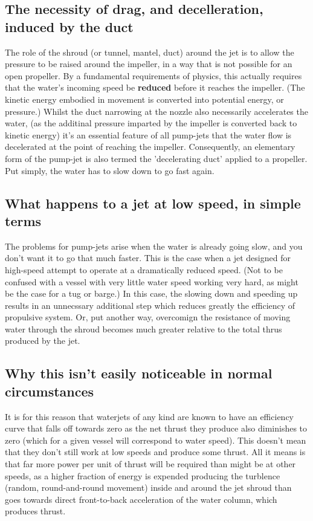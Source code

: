 \documentclass{article}\usepackage[]{graphicx}\usepackage[]{color}
\begin{document}
\subsection{The necessity of drag, and decelleration, induced by the duct}
The role of the shroud (or tunnel, mantel, duct) around the jet is to allow the pressure to be raised around the impeller, in a way that is not possible for an open propeller.  By a fundamental requirements of physics, this actually requires that the water's incoming speed be \textbf{reduced} before it reaches the impeller. (The kinetic energy embodied in movement is converted into potential energy, or pressure.)  Whilst the duct narrowing at the nozzle also necessarily accelerates the water, (as the additinal pressure imparted by the impeller is converted back to kinetic energy) it's an essential feature of all pump-jets that the water flow is decelerated at the point of reaching the impeller. Consequently, an elementary form of the pump-jet is also termed the 'decelerating duct' applied to a propeller.  Put simply, the water has to slow down to go fast again.

\subsection{What happens to a jet at low speed, in simple terms}
The problems for pump-jets arise when the water is already going slow, and you don't want it to go that much faster.  This is the case when a jet designed for high-speed attempt to operate at a dramatically reduced speed.  (Not to be confused with a vessel with very little water speed working very hard, as might be the case for a tug or barge.)  In this case, the slowing down and speeding up results in an unnecssary additional step which reduces greatly the efficiency of propulsive system. Or, put another way, overcomign the resistance of moving water through the shroud becomes much greater relative to the total thrus produced by the jet.

\subsection{Why this isn't easily noticeable in normal circumstances}
It is for this reason that waterjets of any kind are known to have an efficiency curve that falls off towards zero as the net thrust they produce also diminishes to zero (which for a given vessel will correspond to water speed).  This doesn't mean that they don't still work at low speeds and produce some thrust.  All it means is that far more power per unit of thrust will be required than might be at other speeds, as a higher fraction of energy is expended producing the turblence (random, round-and-round movement) inside and around the jet shroud than goes towards direct front-to-back acceleration of the water column, which produces thrust.
\end{document}
